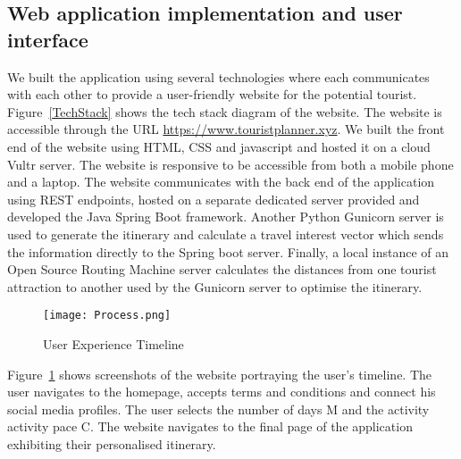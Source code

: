 

\subsection{Web application implementation and user
interface}

We built the application using several technologies
where each communicates with each other to provide a
user-friendly website for the potential tourist.
Figure~\ref{TechStack} shows the tech stack diagram of the website.
The website is accessible through the URL
\url{https://www.touristplanner.xyz}. We built the front end of the website using HTML, CSS and javascript and hosted it
on a cloud Vultr server. The website is 
responsive to be accessible from both a
mobile phone and a laptop. The website communicates
with the back end of the application using REST
endpoints, hosted on a separate dedicated server
provided and developed the Java Spring Boot
framework.  Another Python Gunicorn server is used to
generate the itinerary and calculate a travel interest
vector which sends the information directly to the
Spring boot server. Finally, a local instance of an
Open Source Routing Machine server calculates the
distances from one tourist attraction to another used
by the Gunicorn server to optimise the itinerary. 

\begin{figure}[h]
\centering
\texttt{[image: Process.png]}
\caption{User Experience Timeline}
\label{Timeline}
\end{figure}

Figure~\ref{Timeline} shows screenshots of the website portraying
the user's timeline.  The user navigates to the
homepage, accepts terms and conditions and connect his
social media profiles.  The user selects the number of
days M and the activity activity pace C.  The website
navigates to the final page of the application
exhibiting their personalised itinerary. 
